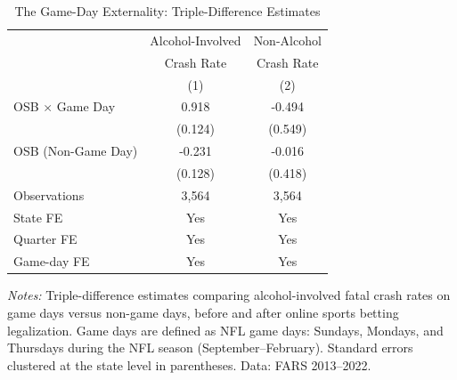 \begin{table}[t]
\centering
\caption{The Game-Day Externality: Triple-Difference Estimates}
\label{tab:gameday}
\small
\begin{tabular}{lcc}
\hline\hline
 & Alcohol-Involved & Non-Alcohol \\
 & Crash Rate & Crash Rate \\
 & (1) & (2) \\
\hline
OSB $\times$ Game Day & 0.918 & -0.494 \\
 & (0.124) & (0.549) \\
OSB (Non-Game Day) & -0.231 & -0.016 \\
 & (0.128) & (0.418) \\
\hline
Observations & 3,564 & 3,564 \\
State FE & Yes & Yes \\
Quarter FE & Yes & Yes \\
Game-day FE & Yes & Yes \\
\hline\hline
\end{tabular}
\begin{tablenotes}
\item \textit{Notes:} Triple-difference estimates comparing alcohol-involved fatal crash rates on game days versus non-game days, before and after online sports betting legalization. Game days are defined as NFL game days: Sundays, Mondays, and Thursdays during the NFL season (September--February). Standard errors clustered at the state level in parentheses. Data: FARS 2013--2022.
\end{tablenotes}
\end{table}
